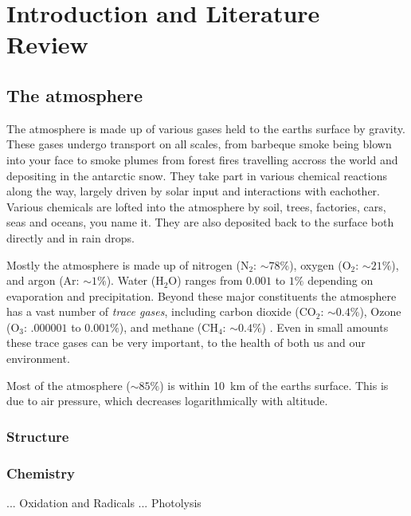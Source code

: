 \chapter{Introduction and Literature Review} %
\label{LR}

\section{The atmosphere}
\label{LR:Atmos}
  The atmosphere is made up of various gases held to the earths surface by gravity. 
  These gases undergo transport on all scales, from barbeque smoke being blown into your face to smoke plumes from forest fires travelling accross the world and depositing in the antarctic snow.
  They take part in various chemical reactions along the way, largely driven by solar input and interactions with eachother.
  Various chemicals are lofted into the atmosphere by soil, trees, factories, cars, seas and oceans, you name it.
  They are also deposited back to the surface both directly and in rain drops.
  
  Mostly the atmosphere is made up of nitrogen (N$_2$: $\sim 78\%$), oxygen (O$_2$: $\sim 21\%$), and argon (Ar: $\sim 1\%$).
  Water (H$_2$O) ranges from $0.001$ to $1\%$ depending on evaporation and precipitation.
  Beyond these major constituents the atmosphere has a vast number of \textit{trace gases}, including carbon dioxide (CO$_2$: $\sim 0.4\%$), Ozone (O$_3$: $.000001$ to $0.001\%$), and methane (CH$_4$: $\sim 0.4\%$) \cite[][Ch. 2]{BrasseurJacob2017}.
  Even in small amounts these trace gases can be very important, to the health of both us and our environment.
  
  Most of the atmosphere ($\sim 85\%$) is within 10~km of the earths surface.
  This is due to air pressure, which decreases logarithmically with altitude.
  

  
  \subsection{Structure}
  \label{LR:Atmos:Struct}
    
    
    
    
  \subsection{Chemistry}
  \label{LR:Atmos:Chem}
    ...
    Oxidation and Radicals
    ...
    Photolysis
    
